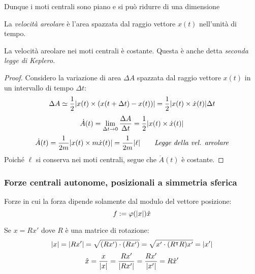 \begin{remark}
    Dunque i moti centrali sono piano e si può ridurre di una dimensione
\end{remark}
\begin{definition}
    La \textit{velocità areolare } è l'area spazzata dal raggio vettore $x(t)$ nell'unità di tempo.
\end{definition}

\begin{proposition}
    La velocità areolare nei moti centrali è costante. Questa è anche detta \textit{seconda legge di Keplero}.
\end{proposition}
\begin{proof}
    Considero la variazione di area $\Delta A$ spazzata dal raggio vettore $x(t)$ in un intervallo di tempo $\Delta t$:
    \begin{equation*}
        \Delta A \simeq \frac{1}{2} \abs{ x(t) \times (x(t+\Delta t) - x(t)) } = \frac{1}{2} \abs{ x(t) \times \dot{x}(t) } \Delta t
    \end{equation*}
    \begin{equation}
        \dot{A}(t) = \lim_{\Delta t \to 0} \frac{\Delta A}{\Delta t} = \frac{1}{2} \abs{ x(t) \times \dot{x}(t) }
    \end{equation}
    \begin{equation}
        \dot{A}(t) = \frac{1}{2m} \abs{ x(t) \times m\dot{x}(t) } = \frac{1}{2m} \abs{ \ell } \qquad \textit{Legge della vel. areolare}
    \end{equation}
    Poiché $\ell$ si conserva nei moti centrali, segue che $\dot{A}(t)$ è costante.
\end{proof}

\subsubsection{Forze centrali autonome, posizionali a simmetria sferica}
Forze in cui la forza dipende solamente dal modulo del vettore posizione:
\begin{equation}
    f:= \varphi(\abs{x})\hat{x}
\end{equation}

Se $x= Rx'$ dove $R$ è una matrice di rotazione:
\begin{equation}
    \abs{x}= \abs{Rx'}= \sqrt{(Rx')\cdot(Rx')}= \sqrt{x'\cdot(R^\intercal R)x'}= \abs{x'}
\end{equation}
\begin{equation}
    \hat{x}=\frac{x}{\abs{x}}= \frac{Rx'}{\abs{Rx'}}= \frac{Rx'}{\abs{x'}}=R\hat{x}'
\end{equation}

